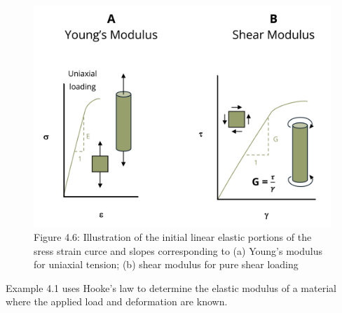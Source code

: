 \documentclass[
  letterpaper,
  DIV=11,
  numbers=noendperiod]{scrreprt}
\theoremstyle{definition}
\theoremstyle{remark}
\begin{document}
\begin{figure}[H]

{\centering \includegraphics[width=5.0625in,height=\textheight]{images/CH4 PNGs/4.6.png}

}

\caption{Figure 4.6: Illustration of the initial linear elastic portions
of the sress strain curce and slopes corresponding to (a) Young's
modulus for uniaxial tension; (b) shear modulus for pure shear loading}

\end{figure}%

Example 4.1 uses Hooke's law to determine the elastic modulus of a
material where the applied load and deformation are known.
\end{document}

